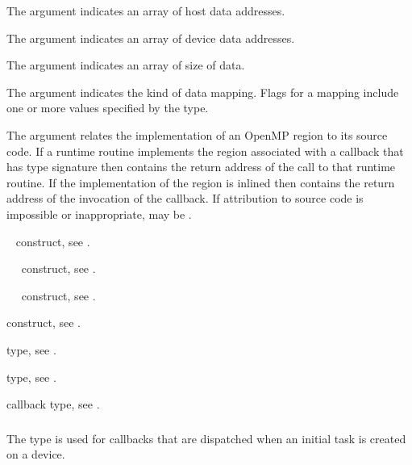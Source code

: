 The  argument indicates an array of host data addresses.

The  argument indicates an array of device data addresses.

The  argument indicates an array of size of data.

The  argument indicates the kind of data mapping. 
Flags for a mapping include one or more values specified by the 
 type.

The  argument relates the implementation of an OpenMP region
to its source code. If a runtime routine implements the region associated with
a callback that has type signature  then
 contains the return address of the call to that runtime routine.
If the implementation of the region is inlined then  contains the
return address of the invocation of the callback. If attribution to source code
is impossible or inappropriate,  may be .

\begin{crossrefs}
\item {}~ construct, see .

\item {}~~ construct,
see .

\item {}~~ construct,
see .

\item {} construct, see .

\item {} type, see .

\item {} type, see .

\item {} callback type, 
see .
\end{crossrefs}



\subsubsection{}
\label{sec:ompt_callback_target_submit_t}
\summary
The  type is used for callbacks that are
dispatched when an initial task is created on a device.

